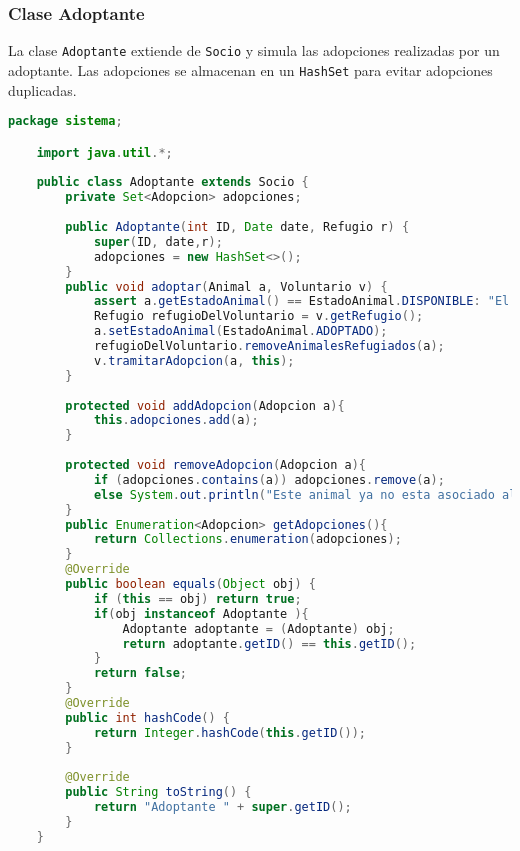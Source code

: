 \subsubsection{Clase Adoptante}\label{codigo:adoptante}
La clase \texttt{Adoptante} extiende de \texttt{Socio} y simula las adopciones realizadas 
por un adoptante. Las adopciones se almacenan en un \texttt{HashSet} para evitar adopciones duplicadas.
\begin{lstlisting}[style = javaNormal, language=Java] 
    package sistema;

    import java.util.*;
    
    public class Adoptante extends Socio {
        private Set<Adopcion> adopciones;
    
        public Adoptante(int ID, Date date, Refugio r) {
            super(ID, date,r);
            adopciones = new HashSet<>();
        }
        public void adoptar(Animal a, Voluntario v) {
            assert a.getEstadoAnimal() == EstadoAnimal.DISPONIBLE: "El animal ya ha sido adoptado";
            Refugio refugioDelVoluntario = v.getRefugio();
            a.setEstadoAnimal(EstadoAnimal.ADOPTADO);
            refugioDelVoluntario.removeAnimalesRefugiados(a);
            v.tramitarAdopcion(a, this);
        }
    
        protected void addAdopcion(Adopcion a){
            this.adopciones.add(a);
        }
    
        protected void removeAdopcion(Adopcion a){
            if (adopciones.contains(a)) adopciones.remove(a);
            else System.out.println("Este animal ya no esta asociado al adoptante");
        }
        public Enumeration<Adopcion> getAdopciones(){
            return Collections.enumeration(adopciones);
        }
        @Override
        public boolean equals(Object obj) {
            if (this == obj) return true;
            if(obj instanceof Adoptante ){
                Adoptante adoptante = (Adoptante) obj;
                return adoptante.getID() == this.getID();
            }
            return false;
        }
        @Override
        public int hashCode() {
            return Integer.hashCode(this.getID());
        }
    
        @Override
        public String toString() {
            return "Adoptante " + super.getID();
        } 
    }    
\end{lstlisting}

